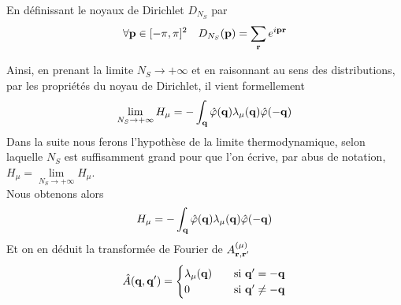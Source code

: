 \documentclass[10pt]{article}
\begin{document}
\begin{multicols}{2}
\begin{equation}
\end{equation}
En définissant le noyaux de Dirichlet $D_{N_S}$ par
\begin{equation}
  \forall {\bf p} \in [-\pi, \pi]^2 \quad D_{N_S} ({\bf p}) =  \sum_{{\bf r}} e^{i {\bf p} {\bf r}} 
\end{equation}


Ainsi, en prenant la limite $N_S \rightarrow + \infty$ et en raisonnant au sens des distributions, par les propriétés du noyau de Dirichlet, il vient formellement
\begin{equation}
 \lim_{N_S \rightarrow + \infty} H_\mu = - \int_{\bf q} \hat{\varphi}({\bf q})  \lambda_\mu({\bf q}) \hat{\varphi}(-{\bf q})
\end{equation}
Dans la suite nous ferons l'hypothèse de la limite thermodynamique, selon laquelle $N_S$ est suffisamment grand pour que l'on écrive, par abus de notation, $H_\mu = \lim\limits_{N_S \rightarrow + \infty} H_\mu$. \\
Nous obtenons alors
\begin{equation}
  H_\mu = - \int_{\bf q} \hat{\varphi}({\bf q})  \lambda_{\mu}({\bf q}) \hat{\varphi}(-{\bf q})
\end{equation}
Et on en déduit la transformée de Fourier de $A_{{\bf r}, {\bf r}'}^{(\mu)}$
\begin{align}
  \hat{A}({\bf q}, {\bf q}') = 
  \begin{cases}
    \lambda_{\mu}({\bf q}) \quad  & \text{si } {\bf q}' = - {\bf q}\\
    0 \quad & \text{si } {\bf q}' \neq - {\bf q}
  \end{cases}
\end{align}


\end{multicols}
\end{document}
